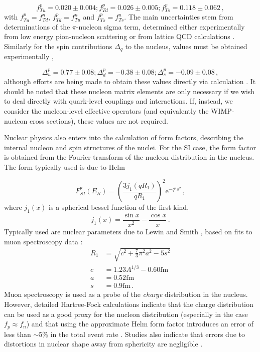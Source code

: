 \begin{equation}
f_{Tu}^p = 0.020 \pm 0.004 ; f_{Td}^p = 0.026 \pm 0.005 ; f_{Ts}^p = 0.118 \pm 0.062\,,
\end{equation}
with $f_{Tu}^p = f_{Td}^n$, $f_{Td}^p = f_{Tu}^n$ and $f_{Ts}^p = f_{Ts}^n$.  The main uncertainties stem from determinations of the $\pi$-nucleon sigma term, determined either experimentally from low energy pion-nucleon scattering \cite{Borasoy:1995, Pavan:2001,Alarcon:2012} or from lattice QCD calculations \cite{Bali:2012, Alvarez-Ruso:2014}. Similarly for the spin contributions $\Delta_q$ to the nucleus, values must be obtained experimentally \cite{Ashman:1988,Jaffe:1990,Engel:1992,Adams:1997}, 

\begin{equation}
\Delta_u^p = 0.77 \pm 0.08 ; \Delta_d^p = -0.38 \pm 0.08 ; \Delta_s^p = -0.09 \pm 0.08\,,
\end{equation}
although efforts are being made to obtain these values directly via calculation \cite{Qing:1998,Thomas:2008}. It should be noted that these nucleon matrix elements are only necessary if we wish to deal directly with quark-level couplings and interactions. If, instead, we consider the nucleon-level effective operators (and equivalently the WIMP-nucleon cross sections), these values are not required. 

Nuclear physics also enters into the calculation of form factors, describing the internal nucleon and spin structures of the nuclei. For the SI case, the form factor is obtained from the Fourier transform of the nucleon distribution in the nucleus. The form typically used is due to Helm \cite{Helm:1956}

\begin{equation}
F_{SI}^2(E_R) = \left(\frac{3j_1(qR_1)}{qR_1}\right)^2 \mathrm{e}^{-q^2s^2}\,,
\end{equation}
where $j_1(x)$ is a spherical bessel function of the first kind,
\begin{equation}
j_1(x) = \frac{\sin x}{x^2} - \frac{\cos x}{x}\,.
\end{equation}
Typically used are nuclear parameters due to Lewin and Smith \cite{Lewin:1996}, based on fits to muon spectroscopy data \cite{Fricke:1995}:
\begin{align}
R_1 & = \sqrt{c^2 + \frac{7}{3}\pi^2a^2 - 5s^2} \\
c & = 1.23A^{1/3} - 0.60 \mathrm{ fm} \\
a & = 0.52 \mathrm{ fm} \\
s & = 0.9 \mathrm{ fm} \,.
\end{align}
Muon spectroscopy is used as a probe of the \textit{charge} distribution in the nucleus. However, detailed Hartree-Fock calculations indicate that the charge distribution can be used as a good proxy for the nucleon distribution (especially in the case $f_p \approx f_n$) and that using the approximate Helm form factor introduces an error of less than $\sim$5\% in the total event rate \cite{Co:2012}. Studies also indicate that errors due to distortions in nuclear shape away from sphericity are negligible \cite{Ya-Zheng:2012}.

